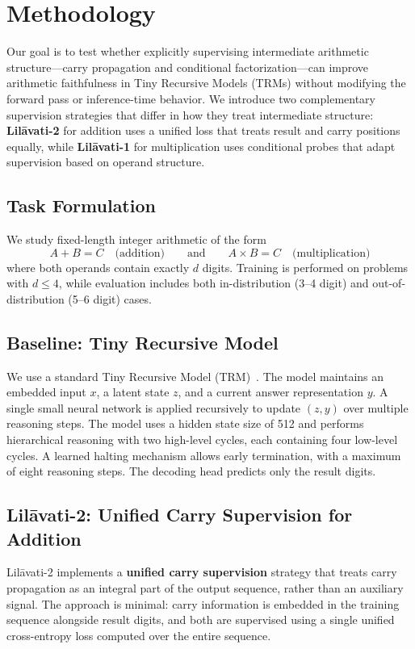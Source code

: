 \section{Methodology}

Our goal is to test whether explicitly supervising intermediate arithmetic structure---carry propagation and conditional factorization---can improve arithmetic faithfulness in Tiny Recursive Models (TRMs) without modifying the forward pass or inference-time behavior. We introduce two complementary supervision strategies that differ in how they treat intermediate structure: \textbf{Lil\={a}vati-2} for addition uses a unified loss that treats result and carry positions equally, while \textbf{Lil\={a}vati-1} for multiplication uses conditional probes that adapt supervision based on operand structure.

\subsection{Task Formulation}
We study fixed-length integer arithmetic of the form
\[
A + B = C \quad \text{(addition)} \qquad \text{and} \qquad A \times B = C \quad \text{(multiplication)}
\]
where both operands contain exactly $d$ digits. Training is performed on problems with $d \leq 4$, while evaluation includes both in-distribution (3--4 digit) and out-of-distribution (5--6 digit) cases.

\subsection{Baseline: Tiny Recursive Model}
We use a standard Tiny Recursive Model (TRM)~\cite{trm2024}. The model maintains an embedded input $x$, a latent state $z$, and a current answer representation $y$. A single small neural network is applied recursively to update $(z,y)$ over multiple reasoning steps. The model uses a hidden state size of 512 and performs hierarchical reasoning with two high-level cycles, each containing four low-level cycles. A learned halting mechanism allows early termination, with a maximum of eight reasoning steps. The decoding head predicts only the result digits.

\subsection{Lil\={a}vati-2: Unified Carry Supervision for Addition}
Lil\={a}vati-2 implements a \textbf{unified carry supervision} strategy that treats carry propagation as an integral part of the output sequence, rather than an auxiliary signal. The approach is minimal: carry information is embedded in the training sequence alongside result digits, and both are supervised using a single unified cross-entropy loss computed over the entire sequence.

